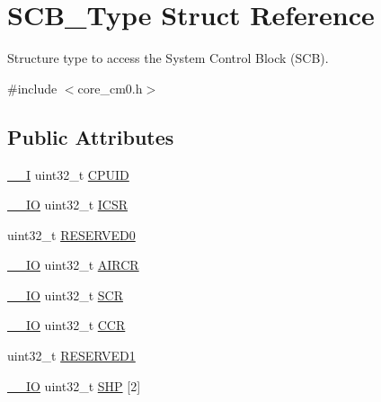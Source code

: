 \hypertarget{struct_s_c_b___type}{}\section{S\+C\+B\+\_\+\+Type Struct Reference}
\label{struct_s_c_b___type}


Structure type to access the System Control Block (S\+CB).  




{\ttfamily \#include $<$core\+\_\+cm0.\+h$>$}

\subsection*{Public Attributes}
\begin{DoxyCompactItemize}
\item 
\hyperlink{group___c_m_s_i_s__core__definitions_gaf63697ed9952cc71e1225efe205f6cd3}{\+\_\+\+\_\+I} uint32\+\_\+t \hyperlink{struct_s_c_b___type_afa7a9ee34dfa1da0b60b4525da285032}{C\+P\+U\+ID}
\item 
\hyperlink{group___c_m_s_i_s__core__definitions_gaec43007d9998a0a0e01faede4133d6be}{\+\_\+\+\_\+\+IO} uint32\+\_\+t \hyperlink{struct_s_c_b___type_a3e66570ab689d28aebefa7e84e85dc4a}{I\+C\+SR}
\item 
uint32\+\_\+t \hyperlink{struct_s_c_b___type_a10960cdc703f661c83a237d9c69db23c}{R\+E\+S\+E\+R\+V\+E\+D0}
\item 
\hyperlink{group___c_m_s_i_s__core__definitions_gaec43007d9998a0a0e01faede4133d6be}{\+\_\+\+\_\+\+IO} uint32\+\_\+t \hyperlink{struct_s_c_b___type_a6ed3c9064013343ea9fd0a73a734f29d}{A\+I\+R\+CR}
\item 
\hyperlink{group___c_m_s_i_s__core__definitions_gaec43007d9998a0a0e01faede4133d6be}{\+\_\+\+\_\+\+IO} uint32\+\_\+t \hyperlink{struct_s_c_b___type_abfad14e7b4534d73d329819625d77a16}{S\+CR}
\item 
\hyperlink{group___c_m_s_i_s__core__definitions_gaec43007d9998a0a0e01faede4133d6be}{\+\_\+\+\_\+\+IO} uint32\+\_\+t \hyperlink{struct_s_c_b___type_a6d273c6b90bad15c91dfbbad0f6e92d8}{C\+CR}
\item 
uint32\+\_\+t \hyperlink{struct_s_c_b___type_adddd65958c1c4c0301f62ede0a9bf12e}{R\+E\+S\+E\+R\+V\+E\+D1}
\item 
\hyperlink{group___c_m_s_i_s__core__definitions_gaec43007d9998a0a0e01faede4133d6be}{\+\_\+\+\_\+\+IO} uint32\+\_\+t \hyperlink{struct_s_c_b___type_a2eeb91c03a8ec3a4c50737bac62d4fc9}{S\+HP} \mbox{[}2\mbox{]}
\end{DoxyCompactItemize}


